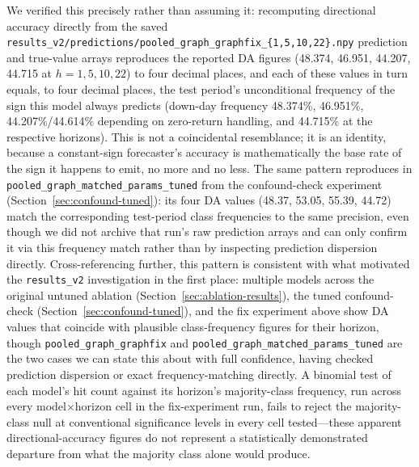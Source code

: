 \documentclass[journal]{IEEEtran}
\begin{document}
We verified this precisely rather than assuming it: recomputing directional accuracy directly from the saved \texttt{results\_v2/predictions/pooled\_graph\_graphfix\_\{1,5,10,22\}.npy} prediction and true-value arrays reproduces the reported DA figures (48.374, 46.951, 44.207, 44.715 at $h=1,5,10,22$) to four decimal places, and each of these values in turn equals, to four decimal places, the test period's unconditional frequency of the sign this model always predicts (down-day frequency 48.374\%, 46.951\%, 44.207\%/44.614\% depending on zero-return handling, and 44.715\% at the respective horizons). This is not a coincidental resemblance; it is an identity, because a constant-sign forecaster's accuracy is mathematically the base rate of the sign it happens to emit, no more and no less. The same pattern reproduces in \texttt{pooled\_graph\_matched\_params\_tuned} from the confound-check experiment (Section~\ref{sec:confound-tuned}): its four DA values (48.37, 53.05, 55.39, 44.72) match the corresponding test-period class frequencies to the same precision, even though we did not archive that run's raw prediction arrays and can only confirm it via this frequency match rather than by inspecting prediction dispersion directly. Cross-referencing further, this pattern is consistent with what motivated the \texttt{results\_v2} investigation in the first place: multiple models across the original untuned ablation (Section~\ref{sec:ablation-results}), the tuned confound-check (Section~\ref{sec:confound-tuned}), and the fix experiment above show DA values that coincide with plausible class-frequency figures for their horizon, though \texttt{pooled\_graph\_graphfix} and \texttt{pooled\_graph\_matched\_params\_tuned} are the two cases we can state this about with full confidence, having checked prediction dispersion or exact frequency-matching directly. A binomial test of each model's hit count against its horizon's majority-class frequency, run across every model$\times$horizon cell in the fix-experiment run, fails to reject the majority-class null at conventional significance levels in every cell tested---these apparent directional-accuracy figures do not represent a statistically demonstrated departure from what the majority class alone would produce.
\end{document}
